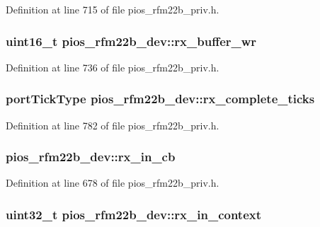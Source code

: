 \-Definition at line 715 of file pios\-\_\-rfm22b\-\_\-priv.\-h.

\hypertarget{structpios__rfm22b__dev_aa31cc789855ee5b29487085603190aa3}{
\subsubsection[{rx\-\_\-buffer\-\_\-wr}]{\setlength{\rightskip}{0pt plus 5cm}uint16\-\_\-t {\bf pios\-\_\-rfm22b\-\_\-dev\-::rx\-\_\-buffer\-\_\-wr}}}\label{structpios__rfm22b__dev_aa31cc789855ee5b29487085603190aa3}


\-Definition at line 736 of file pios\-\_\-rfm22b\-\_\-priv.\-h.

\hypertarget{structpios__rfm22b__dev_a1a3dc2a287da24ec20da3daba8182266}{
\subsubsection[{rx\-\_\-complete\-\_\-ticks}]{\setlength{\rightskip}{0pt plus 5cm}port\-Tick\-Type {\bf pios\-\_\-rfm22b\-\_\-dev\-::rx\-\_\-complete\-\_\-ticks}}}\label{structpios__rfm22b__dev_a1a3dc2a287da24ec20da3daba8182266}


\-Definition at line 782 of file pios\-\_\-rfm22b\-\_\-priv.\-h.

\hypertarget{structpios__rfm22b__dev_ac170322ec2f96932e0f060aa68b6bd12}{
\subsubsection[{rx\-\_\-in\-\_\-cb}]{ {\bf pios\-\_\-rfm22b\-\_\-dev\-::rx\-\_\-in\-\_\-cb}}}\label{structpios__rfm22b__dev_ac170322ec2f96932e0f060aa68b6bd12}


\-Definition at line 678 of file pios\-\_\-rfm22b\-\_\-priv.\-h.

\hypertarget{structpios__rfm22b__dev_a70fce9f445ae6ec87f5a559b89e82169}{
\subsubsection[{rx\-\_\-in\-\_\-context}]{\setlength{\rightskip}{0pt plus 5cm}uint32\-\_\-t {\bf pios\-\_\-rfm22b\-\_\-dev\-::rx\-\_\-in\-\_\-context}}}\label{structpios__rfm22b__dev_a70fce9f445ae6ec87f5a559b89e82169}



